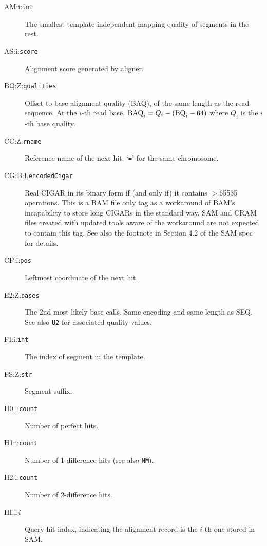 \documentclass[10pt]{article}
\newcommand{\tagvalue}[1]{\tt #1}
\begin{document}
\begin{description}
\item[AM:i:\tagvalue{int}]
The smallest template-independent mapping quality of segments in the rest.

\item[AS:i:\tagvalue{score}]
Alignment score generated by aligner.

\item[BQ:Z:\tagvalue{qualities}]
Offset to base alignment quality (BAQ), of the same length as the read sequence.
At the $i$-th read base, ${\rm BAQ}_i=Q_i-({\rm BQ}_i-64)$ where $Q_i$ is the $i$-th base quality.

\item[CC:Z:\tagvalue{rname}]
Reference name of the next hit; `{\tt =}' for the same chromosome.

\item[CG:B:I,\tagvalue{encodedCigar}]
Real CIGAR in its binary form if (and only if) it contains $>$65535 operations. This is
a BAM file only tag as a workaround of BAM's incapability to store long CIGARs
in the standard way. SAM and CRAM files created with updated tools aware of the
workaround are not expected to contain this tag. See also the footnote in
Section 4.2 of the SAM spec for details.

\item[CP:i:\tagvalue{pos}]
Leftmost coordinate of the next hit.

\item[E2:Z:\tagvalue{bases}]
The 2nd most likely base calls. Same encoding and same length as {\sf SEQ}.
See also {\tt U2} for associated quality values.

\item[FI:i:\tagvalue{int}]
The index of segment in the template.

\item[FS:Z:\tagvalue{str}]
Segment suffix.

\item[H0:i:\tagvalue{count}]
Number of perfect hits.

\item[H1:i:\tagvalue{count}]
Number of 1-difference hits (see also {\tt NM}).

\item[H2:i:\tagvalue{count}]
Number of 2-difference hits.

\item[HI:i:\emph{i}]
Query hit index, indicating the alignment record is the $i$-th one stored
in SAM.


\end{description}
\end{document}
